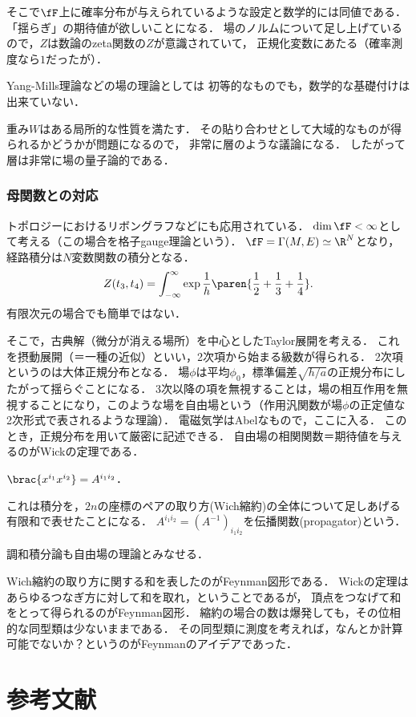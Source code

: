\documentclass[uplatex,dvipdfmx]{jsreport}
\begin{document}
そこで$\fF$上に確率分布が与えられているような設定と数学的には同値である．
「揺らぎ」の期待値が欲しいことになる．
場のノルムについて足し上げているので，$Z$は数論のzeta関数の$Z$が意識されていて，
正規化変数にあたる（確率測度なら$1$だったが）．

Yang-Mills理論などの場の理論としては
初等的なものでも，数学的な基礎付けは出来ていない．

重み$W$はある局所的な性質を満たす．
その貼り合わせとして大域的なものが得られるかどうかが問題になるので，
非常に層のような議論になる．
したがって層は非常に場の量子論的である．

\subsection{母関数との対応}

トポロジーにおけるリボングラフなどにも応用されている．
$\dim\fF<\infty$として考える（この場合を格子gauge理論という）．
$\fF=\Gamma(M,E)\simeq\R^N$となり，経路積分は$N$変数関数の積分となる．
\[Z(t_3,t_4)=\int^\infty_{-\infty}\exp\frac{1}{h}\paren{\frac{1}{2}+\frac{1}{3}+\frac{1}{4}}.\]
有限次元の場合でも簡単ではない．

そこで，古典解（微分が消える場所）を中心としたTaylor展開を考える．
これを摂動展開（＝一種の近似）といい，2次項から始まる級数が得られる．
2次項というのは大体正規分布となる．
場$\phi$は平均$\phi_0$，標準偏差$\sqrt{h/a}$の正規分布にしたがって揺らぐことになる．
3次以降の項を無視することは，場の相互作用を無視することになり，このような場を自由場という（作用汎関数が場$\phi$の正定値な2次形式で表されるような理論）．
電磁気学はAbelなもので，ここに入る．
このとき，正規分布を用いて厳密に記述できる．
自由場の相関関数＝期待値を与えるのがWickの定理である．
\begin{theorem}[Wick]
    $\brac{x^{i_1}x^{i_2}}=A^{i_1i_2}$．
\end{theorem}
これは積分を，$2n$の座標のペアの取り方(Wich縮約)の全体について足しあげる有限和で表せたことになる．
$A^{i_1i_2}=(A^{-1})_{i_1i_2}$を伝播関数(propagator)という．

調和積分論も自由場の理論とみなせる．

Wich縮約の取り方に関する和を表したのがFeynman図形である．
Wickの定理はあらゆるつなぎ方に対して和を取れ，ということであるが，
頂点をつなげて和をとって得られるのがFeynman図形．
縮約の場合の数は爆発しても，その位相的な同型類は少ないままである．
その同型類に測度を考えれば，なんとか計算可能でないか？というのがFeynmanのアイデアであった．

\chapter{参考文献}
\end{document}
